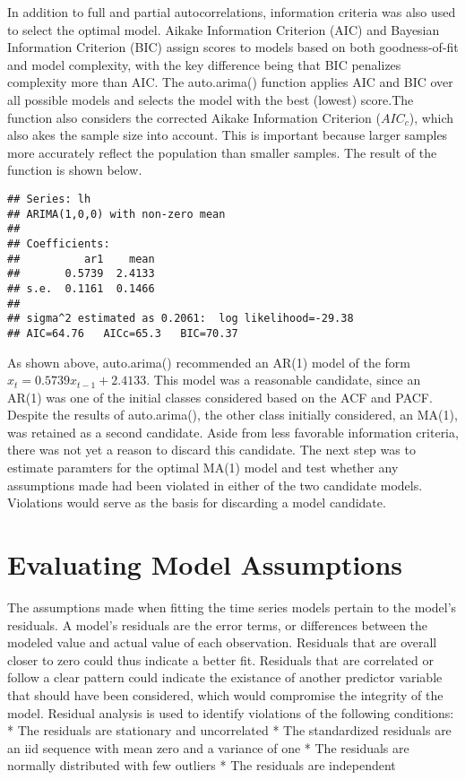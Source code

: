 \documentclass[]{article}
\begin{document}
In addition to full and partial autocorrelations, information criteria
was also used to select the optimal model. Aikake Information Criterion
(AIC) and Bayesian Information Criterion (BIC) assign scores to models
based on both goodness-of-fit and model complexity, with the key
difference being that BIC penalizes complexity more than AIC. The
auto.arima() function applies AIC and BIC over all possible models and
selects the model with the best (lowest) score.The function also
considers the corrected Aikake Information Criterion (\(AIC_c\)), which
also akes the sample size into account. This is important because larger
samples more accurately reflect the population than smaller samples. The
result of the function is shown below.

\begin{verbatim}
## Series: lh 
## ARIMA(1,0,0) with non-zero mean 
## 
## Coefficients:
##          ar1    mean
##       0.5739  2.4133
## s.e.  0.1161  0.1466
## 
## sigma^2 estimated as 0.2061:  log likelihood=-29.38
## AIC=64.76   AICc=65.3   BIC=70.37
\end{verbatim}

As shown above, auto.arima() recommended an AR(1) model of the form
\(x_t=0.5739x_{t-1}+2.4133\). This model was a reasonable candidate,
since an AR(1) was one of the initial classes considered based on the
ACF and PACF. Despite the results of auto.arima(), the other class
initially considered, an MA(1), was retained as a second candidate.
Aside from less favorable information criteria, there was not yet a
reason to discard this candidate. The next step was to estimate
paramters for the optimal MA(1) model and test whether any assumptions
made had been violated in either of the two candidate models. Violations
would serve as the basis for discarding a model candidate.

\section{Evaluating Model
Assumptions}\label{evaluating-model-assumptions}

The assumptions made when fitting the time series models pertain to the
model's residuals. A model's residuals are the error terms, or
differences between the modeled value and actual value of each
observation. Residuals that are overall closer to zero could thus
indicate a better fit. Residuals that are correlated or follow a clear
pattern could indicate the existance of another predictor variable that
should have been considered, which would compromise the integrity of the
model. Residual analysis is used to identify violations of the following
conditions: * The residuals are stationary and uncorrelated * The
standardized residuals are an iid sequence with mean zero and a variance
of one * The residuals are normally distributed with few outliers * The
residuals are independent
\end{document}

